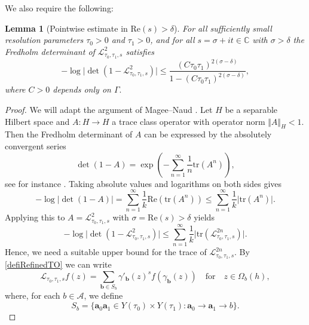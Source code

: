 \documentclass[12pt,letterpaper]{amsart}
\theoremstyle{plain}
\newtheorem{lemma}[prop]{Lemma}
\theoremstyle{definition}
\theoremstyle{remark}
\newcommand{\Aa}{\textbf{a}}
\newcommand{\Bb}{\textbf{b}}
\newcommand{\CC}{\mathbb{C}}
\begin{document}
We also require the following:

\begin{lemma}[Pointwise estimate in $\mathrm{Re}(s) > \delta$]\label{lem:pointwiseEst} For all sufficiently small resolution parameters $\tau_0 > 0 $ and $\tau_1  >0 $, and for all $s = \sigma +it\in \CC$ with $\sigma > \delta$ the Fredholm determinant of $ \mathcal{L}_{\tau_0, \tau_1, s}^2 $ satisfies
\begin{equation*}
- \log \vert \det\left( 1-\mathcal{L}_{\tau_0, \tau_1, s}^2  \right)\vert \le  \frac{(C \tau_0 \tau_1)^{2(\sigma-\delta)}}{ 1- (C \tau_0 \tau_1)^{2(\sigma-\delta)}},
\end{equation*}
where $C>0$ depends only on $\Gamma.$
\end{lemma}

\begin{proof}
We will adapt the argument of Magee--Naud \cite{NaudMagee}. Let $H$ be a separable Hilbert space and $A\colon H\to H$ a trace class operator with operator norm $\Vert A\Vert_H < 1$. Then the Fredholm determinant of $A$ can be expressed by the absolutely convergent series
\begin{equation}
\det(1-A) = \exp\left( -\sum_{n=1}^\infty \frac{1}{n} \mathrm{tr}(A^n) \right),
\end{equation}
see for instance \cite{Gohberg_Goldberg_Krupnik}. Taking absolute values and logarithms on both sides gives
\begin{equation}
- \log \vert \det(1-A)\vert =  \sum_{n=1}^\infty \frac{1}{k} \mathrm{Re}(\mathrm{tr}(A^n)) \le \sum_{n=1}^\infty \frac{1}{k} \vert \mathrm{tr}(A^n) \vert.
\end{equation}
Applying this to $A=\mathcal{L}_{\tau_0, \tau_1, s}^2$ with $\sigma = \mathrm{Re}(s)>\delta$ yields
\begin{equation}\label{ineq_exp}
- \log \vert \det( 1- \mathcal{L}_{\tau_0, \tau_1, s}^2)\vert \le  \sum_{n=1}^\infty \frac{1}{k} \vert \mathrm{tr}(\mathcal{L}_{\tau_0, \tau_1, s}^{2n})\vert.
\end{equation}
Hence, we need a suitable upper bound for the trace of $\mathcal{L}_{\tau_0, \tau_1, s}^{2n}$. By \eqref{defiRefinedTO} we can write
\begin{equation}
\mathcal{L}_{\tau_0, \tau_1, s} f(z) = \sum_{\Bb\in S_b} \gamma'_{\Bb}(z)^s  f(\gamma_{\Bb}(z)) \quad \text{for}\quad z\in \Omega_b(h),
\end{equation}
where, for each $b\in \mathcal{A}$, we define
$$
S_b = \{ \Aa_0\Aa_1 \in Y(\tau_0) \times Y(\tau_1): \Aa_0 \to \Aa_1 \to b  \}.
$$
\end{proof}
\end{document}
